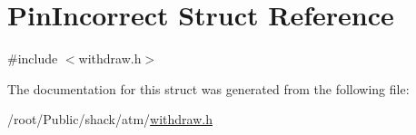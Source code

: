 \hypertarget{structPinIncorrect}{\section{Pin\-Incorrect Struct Reference}
\label{structPinIncorrect}
}


{\ttfamily \#include $<$withdraw.\-h$>$}



The documentation for this struct was generated from the following file\-:\begin{DoxyCompactItemize}
\item 
/root/\-Public/shack/atm/\hyperlink{withdraw_8h}{withdraw.\-h}\end{DoxyCompactItemize}

